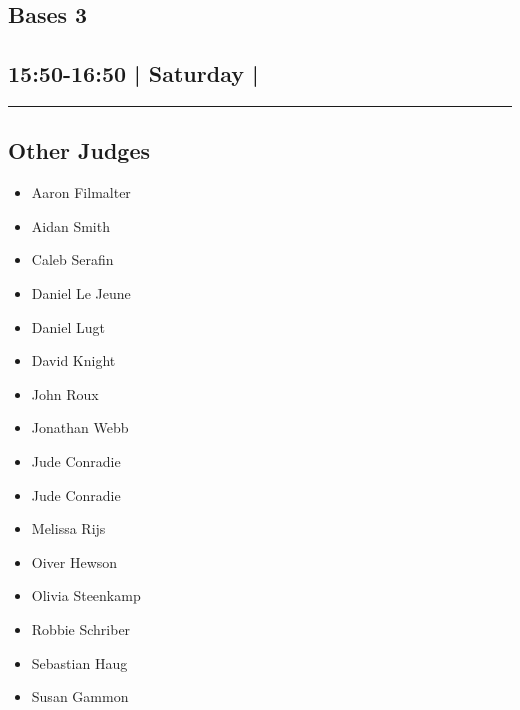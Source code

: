 \documentclass[10pt, A5]{article}
\begin{document}
		\begin{framed}
			\begin{minipage}{\textwidth}

			\setcounter{section}{54}
							\section{Bases 3}
						
			\subsection*{15:50-16:50 | Saturday | }

			\vspace{0.25cm}
			\hrule
			\vspace{0.25cm}


			\subsection*{Other Judges}
							

				\begin{multicols}{2}

			\begin{itemize}
											\item Aaron Filmalter
											\item Aidan Smith
											\item Caleb Serafin
											\item Daniel Le Jeune
											\item Daniel Lugt
											\item David Knight
											\item John Roux
											\item Jonathan Webb
											\item Jude Conradie
								\end{itemize}

			\vfill\null
			\columnbreak

			\begin{itemize}
											\item Jude Conradie
											\item Melissa Rijs
											\item Oiver Hewson
											\item Olivia Steenkamp
											\item Robbie Schriber
											\item Sebastian Haug
											\item Susan Gammon
								\end{itemize}


\end{multicols}
\end{minipage}
\end{framed}
\end{document}

